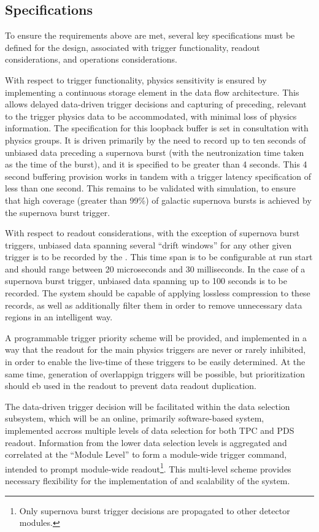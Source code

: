 \subsection{Specifications}
\label{sec:fd-daq:specifications}

To ensure the requirements above are
met, several key specifications must be defined for the 
design, associated with trigger functionality, readout considerations,
and operations considerations. 

With respect to trigger functionality, physics sensitivity is ensured
by implementing a continuous storage element in the data flow
architecture. This allows delayed data-driven trigger decisions and
capturing of preceding, relevant to the trigger physics data to be
accommodated, with minimal loss of physics information. The
specification for this loopback buffer is set in consultation with
physics groups. It is driven primarily by the need to record up to ten
seconds of unbiased data preceding a supernova burst (with the
neutronization time taken as the time of the burst), and it is
specified to be greater than 4 seconds. This 4 second
buffering provision works in tandem with a trigger latency
specification of less than one second. This remains to be validated
with simulation, to ensure that high coverage (greater than 99\%) of galactic supernova
bursts is achieved by the supernova burst trigger.

With respect to readout considerations, with the exception of
supernova burst triggers, unbiased data spanning several ``drift
windows'' for any other given trigger is
to be recorded by the . This time span is to be configurable at run start and
should range between 20 microseconds and 30 milliseconds. In the case
of a supernova burst trigger, unbiased data spanning up to 100 seconds
is to be recorded. The  system should be capable of
applying lossless compression to these records, as well as
additionally filter them in order to remove unnecessary data regions
in an intelligent way.

A programmable trigger priority scheme will be provided, and
implemented in a way that the readout for the main physics triggers
are never or rarely inhibited, in order to enable the live-time of
these triggers to be easily determined. At the same time, generation
of overlappign triggers will be possible, but prioritization should eb
used in the readout to prevent data readout duplication. 

The data-driven trigger decision will be facilitated within the data
selection subsystem, which will be an online, primarily software-based system, implemented accross multiple levels of
data selection for both TPC and PDS readout. Information from the
lower data selection levels is aggregated and correlated at the
``Module Level'' to form a module-wide trigger command, intended to
prompt module-wide readout\footnote{Only supernova burst trigger decisions are
propagated to other detector modules.}.
This multi-level scheme provides necessary flexibility for the
implementation of and scalability of the  system. 
 
